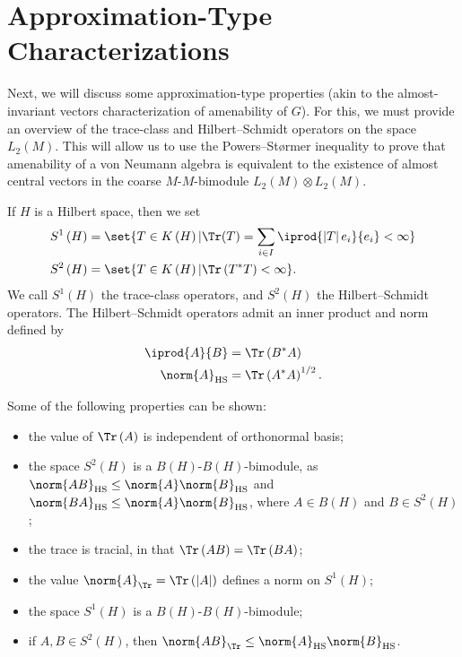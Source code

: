 \documentclass[10pt]{mypackage}
\begin{document}
\section{Approximation-Type Characterizations}%
Next, we will discuss some approximation-type properties (akin to the almost-invariant vectors characterization of amenability of $G$). For this, we must provide an overview of the trace-class and Hilbert--Schmidt operators on the space $L_2\left( M \right)$. This will allow us to use the Powers--Størmer inequality to prove that amenability of a von Neumann algebra is equivalent to the existence of almost central vectors in the coarse $M$-$M$-bimodule $L_2\left( M \right)\otimes L_2\left( M \right)$.
\begin{definition}
  If $H$ is a Hilbert space, then we set
  \begin{align*}
    S^1\left( H \right) &= \set{T\in K\left( H \right) | \Tr(T) = \sum_{i\in I} \iprod{\left\vert T \right\vert e_i}{e_i} < \infty}\\
    S^2\left( H \right) &= \set{T\in K\left( H \right) | \Tr\left( T^{\ast}T \right) < \infty}.
  \end{align*}
  We call $S^1\left( H \right)$ the trace-class operators, and $S^2\left( H \right)$ the Hilbert--Schmidt operators. The Hilbert--Schmidt operators admit an inner product and norm defined by
  \begin{align*}
    \iprod{A}{B} &= \Tr\left( B^{\ast}A \right)\\
    \norm{A}_{\operatorname{HS}} &= \Tr\left( A^{\ast}A \right)^{1/2}.
  \end{align*}
\end{definition}
Some of the following properties can be shown:
\begin{itemize}
  \item the value of $\Tr\left( A \right)$ is independent of orthonormal basis;
  \item the space $S^2\left( H \right)$ is a $B\left( H \right)$-$B\left( H \right)$-bimodule, as $\norm{AB}_{\operatorname{HS}}\leq \norm{A}\norm{B}_{\operatorname{HS}}$ and $\norm{BA}_{\operatorname{HS}}\leq \norm{A}\norm{B}_{\operatorname{HS}}$, where $A\in B(H)$ and $B\in S^2\left( H \right)$;
  \item the trace is tracial, in that $\Tr\left( AB \right) = \Tr\left( BA \right)$;
  \item the value $\norm{A}_{\Tr} = \Tr\left( \left\vert A \right\vert \right)$ defines a norm on $S^1\left( H \right)$;
  \item the space $S^1\left( H \right)$ is a $B\left( H \right)$-$B\left( H \right)$-bimodule;
  \item if $A,B\in S^2\left( H \right)$, then $\norm{AB}_{\Tr} \leq \norm{A}_{\operatorname{HS}}\norm{B}_{\operatorname{HS}}$.
\end{itemize}
\end{document}
